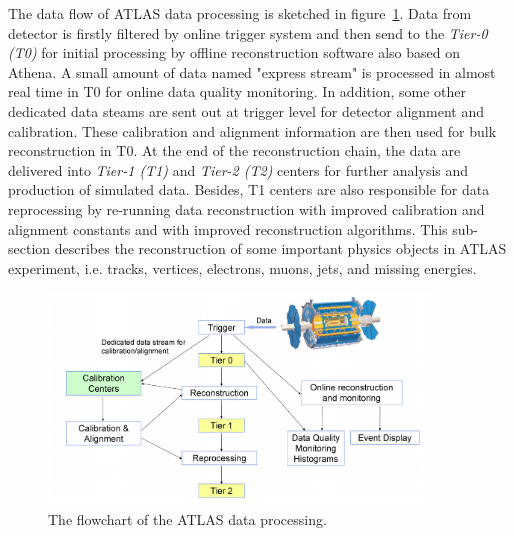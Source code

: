 The data flow of ATLAS data processing is sketched in figure~\ref{fig:data_processing}\cite{Boyd_2010}. 
Data from detector is firstly filtered by online trigger system and then send to the \textit{Tier-0 (T0)} for initial processing by offline reconstruction software also based on Athena.
A small amount of data named "express stream" is processed in almost real time in T0 for online data quality monitoring.
In addition, some other dedicated data steams are sent out at trigger level for detector alignment and calibration.
These calibration and alignment information are then used for bulk reconstruction in T0.
At the end of the reconstruction chain, the data are delivered into \textit{Tier-1 (T1)} and \textit{Tier-2 (T2)} centers for further analysis and production of simulated data.
Besides, T1 centers are also responsible for data reprocessing by re-running data reconstruction with improved calibration and alignment constants and with improved reconstruction algorithms.
This sub-section describes the reconstruction of some important physics objects in ATLAS experiment, i.e. tracks, vertices, electrons, muons, jets, and missing energies.
\begin{figure}[!htb]
  \centering
  \includegraphics[width=0.9\textwidth]{figures/Simulation/data_processing.png}
  \caption{The flowchart of the ATLAS data processing.}
  \label{fig:data_processing}
\end{figure}


